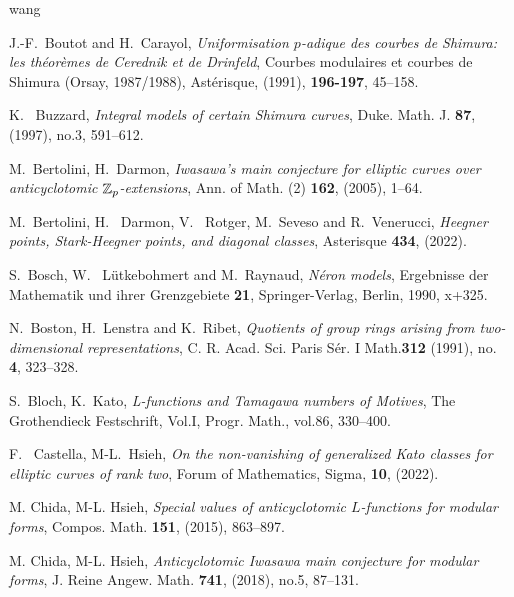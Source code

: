 \begin{thebibliography}{wang}

J.-F.~Boutot and  H.~Carayol,
 {\em Uniformisation {$p$}-adique des courbes de {S}himura: les
 th\'{e}or\`emes de {C}erednik et de {D}rinfeld}, Courbes modulaires et courbes de Shimura (Orsay, 1987/1988), Ast\'{e}risque, (1991), {\bf 196-197}, 45--158.

K.~ Buzzard, 
 {\em Integral models of certain Shimura curves}, Duke. Math. J. {\bf 87}, (1997), no.3, 591--612. 
 
M.~Bertolini, H.~Darmon,
{\em Iwasawa's main conjecture for elliptic curves over anticyclotomic {$\Bbb Z_p$}-extensions}, Ann. of Math. (2) {\bf 162}, (2005), 1--64. 

M.~Bertolini, H.~ Darmon, V.~ Rotger, M.~Seveso and R.~Venerucci, {\em Heegner points, Stark-Heegner points, and diagonal classes}, Asterisque  {\bf 434}, (2022).

S.~Bosch, W.~ L\"{u}tkebohmert and M.~Raynaud,
{\em N\'{e}ron models}, Ergebnisse der Mathematik und ihrer Grenzgebiete {\bf 21}, Springer-Verlag, Berlin, 1990, x+325. 

 N.~Boston,  H.~Lenstra and K.~Ribet, {\em Quotients of group rings arising from two-dimensional representations},
C. R. Acad. Sci. Paris S\'{e}r. I Math.{\bf 312} (1991), no. {\bf 4}, 323--328. 

 S.~Bloch, K.~Kato, {\em L-functions and Tamagawa numbers of Motives}, The Grothendieck Festschrift, Vol.I, Progr. Math., vol.86, 330--400.

              
F.~ Castella, M-L.~Hsieh,
{\em On the non-vanishing of generalized Kato classes for elliptic curves of rank two},  
Forum of Mathematics, Sigma, {\bf 10}, (2022).      
                          
M. Chida, M-L. Hsieh,
 {\em Special values of anticyclotomic {$L$}-functions for modular
              forms}, Compos. Math. {\bf 151}, (2015), 863--897.
              
M. Chida, M-L. Hsieh,
 {\em Anticyclotomic Iwasawa main conjecture for modular
         forms}, J. Reine Angew. Math. {\bf 741}, (2018), no.5, 87--131.
         
         

\end{thebibliography}
